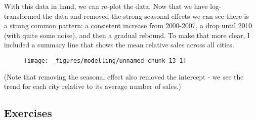 \begin{Shaded}
\end{Shaded}

With this data in hand, we can re-plot the data. Now that we have
log-transformed the data and removed the strong seasonal effects we can
see there is a strong common pattern: a consistent increase from
2000-2007, a drop until 2010 (with quite some noise), and then a gradual
rebound. To make that more clear, I included a summary line that shows
the mean relative sales across all cities.

\begin{Shaded}
\begin{Highlighting}[]
\OperatorTok{+}
\StringTok{  }\NormalTok{(}\NormalTok{(} \OperatorTok{/}\NormalTok{) }\OperatorTok{+}\StringTok{ }
\StringTok{  }\NormalTok{(} \NormalTok{, } \NormalTok{, } \NormalTok{)}
\end{Highlighting}
\end{Shaded}

\begin{figure}[H]
  \texttt{[image: \_figures/modelling/unnamed-chunk-13-1]}
\end{figure}

(Note that removing the seasonal effect also removed the intercept - we
see the trend for each city relative to its average number of sales.)

\hypertarget{exercises-1}{%
\subsection{Exercises}\label{exercises-1}}

